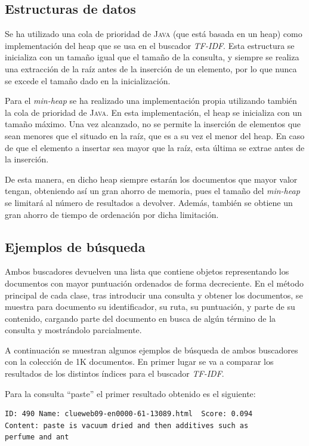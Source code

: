 \documentclass[spanish]{assignment}
\begin{document}
	\subsection{Estructuras de datos}
	Se ha utilizado una cola de prioridad de \textsc{Java} (que está basada en un heap) como implementación del heap que se usa en el buscador \textit{TF-IDF}. Esta estructura se inicializa con un tamaño igual que el tamaño de la consulta, y siempre se realiza una extracción de la raíz antes de la inserción de un elemento, por lo que nunca se excede el tamaño dado en la inicialización.
	
	Para el \textit{min-heap} se ha realizado una implementación propia utilizando también la cola de prioridad de \textsc{Java}. En esta implementación, el heap se inicializa con un tamaño máximo. Una vez alcanzado, no se permite la inserción de elementos que sean menores que el situado en la raíz, que es a su vez el menor del heap. En caso de que el elemento a insertar sea mayor que la raíz, esta última se extrae antes de la inserción. 
	
	De esta manera, en dicho heap siempre estarán los documentos que mayor valor tengan, obteniendo así un gran ahorro de memoria, pues el tamaño del \textit{min-heap} se limitará al número de resultados a devolver. Además, también se obtiene un gran ahorro de tiempo de ordenación por dicha limitación.

	\subsection{Ejemplos de búsqueda}
	Ambos buscadores devuelven una lista que contiene objetos representando los documentos con mayor puntuación ordenados de forma decreciente. En el método principal de cada clase, tras introducir una consulta y obtener los documentos, se muestra para documento su identificador, su ruta, su puntuación, y parte de su contenido, cargando parte del documento en busca de algún término de la consulta y mostrándolo parcialmente.
	
	A continuación se muestran algunos ejemplos de búsqueda de ambos buscadores con la colección de 1K documentos. En primer lugar se va a comparar los resultados de los distintos índices para el buscador \textit{TF-IDF}. 
	
	Para la consulta ``paste'' el primer resultado obtenido es el siguiente:
	\begin{lstlisting}
ID: 490	Name: clueweb09-en0000-61-13089.html  Score: 0.094
Content: paste is vacuum dried and then additives such as
perfume and ant
	\end{lstlisting}       
	
\end{document}
